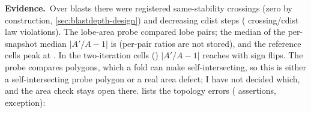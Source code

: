 \documentclass[11pt,a4paper]{article}
\newcommand{\evidence}{\par\smallskip\noindent\textbf{Evidence.}~}
\begin{document}
\evidence Over \NumDeepBlasts{} blasts there were
\NumDeepSameStability{} registered same-stability crossings (zero by
construction, \cref{sec:blastdepth-design}) and \NumDeepCdistDecreasing{}
decreasing cdist steps (\NumDeepLawViolations{} crossing/cdist law
violations). The lobe-area probe
compared \NumDeepLobeCompared{} lobe pairs; the median of the per-snapshot
median $|A'/A-1|$ is \NumDeepLobeRatioMedian{} (per-pair ratios are not
stored), and the reference cells peak at \NumDeepLobeRatioMaxReference.
In the two-iteration cells (\NumDeepLobeRatioMaxWhere) $|A'/A-1|$ reaches
\NumDeepLobeRatioMax{} with \NumDeepLobeSignFlips{} sign flips. The probe
compares polygons, which a fold can make self-intersecting, so this is
either a self-intersecting probe polygon or a real area defect; I have not
decided which, and the area check stays open there.
 lists the topology errors
(\NumDeepErrorAsserts{} assertions, \NumDeepErrorExceptions{} exception):
\end{document}
